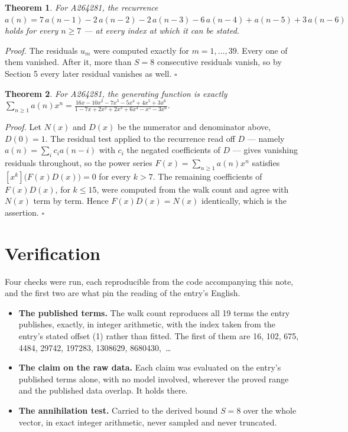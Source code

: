 \documentclass[11pt]{article}
\newtheorem{theorem}{Theorem}
\theoremstyle{definition}
\begin{document}
\begin{theorem} For A264281, the recurrence $a(n) = 7\,a(n-1) - 2\,a(n-2) - 2\,a(n-3) - 6\,a(n-4) + a(n-5) + 3\,a(n-6)$ holds for every $n \ge 7$ --- at every index at which it can be stated.\end{theorem}

{\itshape Proof.} The residuals $u_m$ were computed exactly for $m = 1,\dots,39$. Every one of them vanished. After it, more than $S = 8$ consecutive residuals vanish, so by Section 5 every later residual vanishes as well. $\square$

\begin{theorem} For A264281, the generating function is exactly $\sum_{n\ge 1} a(n)x^n = \frac{16x - 10x^{2} - 7x^{3} - 5x^{4} + 4x^{5} + 3x^{6}}{1 - 7x + 2x^{2} + 2x^{3} + 6x^{4} - x^{5} - 3x^{6}}$.\end{theorem}

{\itshape Proof.} Let $N(x)$ and $D(x)$ be the numerator and denominator above, $D(0)=1$. The residual test applied to the recurrence read off $D$ --- namely $a(n) = \sum_i c_i a(n-i)$ with $c_i$ the negated coefficients of $D$ --- gives vanishing residuals throughout, so the power series $F(x)=\sum_{n\ge 1}a(n)x^n$ satisfies $[x^k]\bigl(F(x)D(x)\bigr) = 0$ for every $k > 7$. The remaining coefficients of $F(x)D(x)$, for $k \le 15$, were computed from the walk count and agree with $N(x)$ term by term. Hence $F(x)D(x) = N(x)$ identically, which is the assertion. $\square$

\section{Verification}

Four checks were run, each reproducible from the code accompanying this note, and the first two are what pin the reading of the entry's English.

\begin{itemize}

\item {\bfseries The published terms.} The walk count reproduces all 19 terms the entry publishes, exactly, in integer arithmetic, with the index taken from the entry's stated offset (1) rather than fitted. The first of them are 16, 102, 675, 4484, 29742, 197283, 1308629, 8680430,~\dots

\item {\bfseries The claim on the raw data.} Each claim was evaluated on the entry's published terms alone, with no model involved, wherever the proved range and the published data overlap. It holds there.

\item {\bfseries The annihilation test.} Carried to the derived bound $S = 8$ over the whole vector, in exact integer arithmetic, never sampled and never truncated.

\end{itemize}
\end{document}
